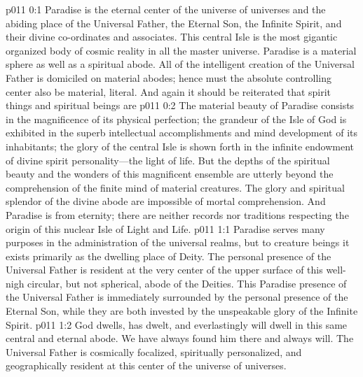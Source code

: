 \author{Perfector of Wisdom}
\vs p011 0:1 Paradise is the eternal center of the universe of universes and the abiding place of the Universal Father, the Eternal Son, the Infinite Spirit, and their divine co\hyp{}ordinates and associates. This central Isle is the most gigantic organized body of cosmic reality in all the master universe. Paradise is a material sphere as well as a spiritual abode. All of the intelligent creation of the Universal Father is domiciled on material abodes; hence must the absolute controlling center also be material, literal. And again it should be reiterated that spirit things and spiritual beings are 
\vs p011 0:2 The material beauty of Paradise consists in the magnificence of its physical perfection; the grandeur of the Isle of God is exhibited in the superb intellectual accomplishments and mind development of its inhabitants; the glory of the central Isle is shown forth in the infinite endowment of divine spirit personality---the light of life. But the depths of the spiritual beauty and the wonders of this magnificent ensemble are utterly beyond the comprehension of the finite mind of material creatures. The glory and spiritual splendor of the divine abode are impossible of mortal comprehension. And Paradise is from eternity; there are neither records nor traditions respecting the origin of this nuclear Isle of Light and Life.
\vs p011 1:1 Paradise serves many purposes in the administration of the universal realms, but to creature beings it exists primarily as the dwelling place of Deity. The personal presence of the Universal Father is resident at the very center of the upper surface of this well\hyp{}nigh circular, but not spherical, abode of the Deities. This Paradise presence of the Universal Father is immediately surrounded by the personal presence of the Eternal Son, while they are both invested by the unspeakable glory of the Infinite Spirit.
\vs p011 1:2 God dwells, has dwelt, and everlastingly will dwell in this same central and eternal abode. We have always found him there and always will. The Universal Father is cosmically focalized, spiritually personalized, and geographically resident at this center of the universe of universes.
